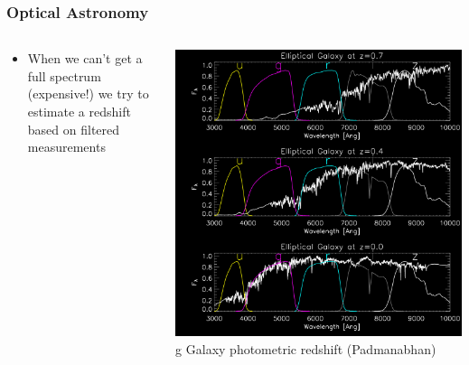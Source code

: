 \documentclass{beamer}
\begin{document}
\frame
{

    \frametitle{Optical Astronomy}


    \begin{columns}
        \begin{column}{0.5\textwidth}
            \begin{itemize}

                \item When we can't get a full spectrum (expensive!) we try
                    to estimate a redshift based on filtered measurements


            \end{itemize}
        \end{column}
        \begin{column}{0.5\textwidth}
            \begin{center}
                \includegraphics[width=\textwidth]{lrg_spectrum_inv.png}
g               \newline
                {\tiny Galaxy photometric redshift (Padmanabhan)}
            \end{center}

            
        \end{column}
    \end{columns}


}
\end{document}
